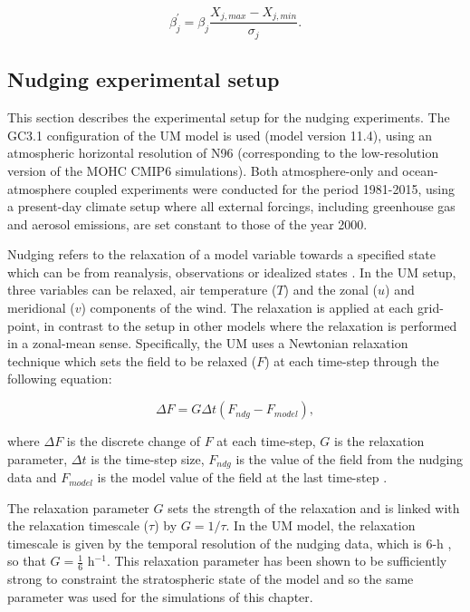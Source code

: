 \begin{equation}
\beta_j^\prime=\beta_j\frac{X_{j,max}-X_{j,min}}{\sigma_j}.
\end{equation}


\subsection{Nudging experimental setup}\label{nudg_setup}

This section describes the experimental setup for the nudging experiments. 
The GC3.1 configuration of the UM model is used (model version 11.4), using an atmospheric horizontal resolution of N96 (corresponding to the low-resolution version of the MOHC CMIP6 simulations). 
Both atmosphere-only and ocean-atmosphere coupled experiments were conducted for the period 1981-2015, using a present-day climate setup where all external forcings, including greenhouse gas and aerosol emissions, are set constant to those of the year 2000. %

Nudging refers to the relaxation of a model variable towards a specified state which can be from reanalysis, observations or idealized states \citep{gray2020,martin2021}. In the UM setup, three variables can be relaxed, air temperature ($T$) and the zonal ($u$) and meridional ($v$) components of the wind. The relaxation is applied at each grid-point, in contrast to the setup in other models \citep[e.g.][]{martin2021} where the relaxation is performed in a zonal-mean sense. Specifically, the UM uses a Newtonian relaxation technique \citep{telford2008description,gray2020} which sets the field to be relaxed ($F$) at each time-step through the following equation:  


\begin{equation}
\Delta F=G\Delta t (F_{ndg}-F_{model}),
\end{equation}

\noindent where $\Delta F$ is the discrete change of $F$ at each time-step, $G$ is the relaxation parameter, $\Delta t$ is the time-step size, $F_{ndg}$ is the value of the field from the nudging data and $F_{model}$ is the model value of the field at the last time-step \citep{telford2008description}.

The relaxation parameter $G$ sets the strength of the relaxation and is linked with the relaxation timescale ($\tau$) by $G=1/\tau$. In the UM model, the relaxation timescale is given by the temporal resolution of the nudging data, which is 6-h \citep{telford2008description,gray2020}, so that $G=\frac{1}{6}$ h$^{-1}$. This relaxation parameter has been shown to be sufficiently strong to constraint the stratospheric state of the model \citep{gray2020} and so the same parameter was used for the simulations of this chapter. 

